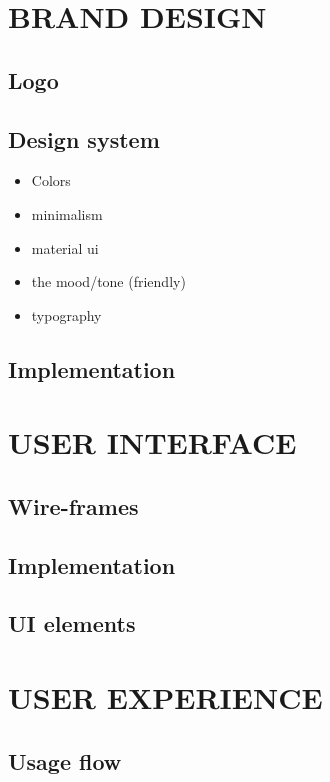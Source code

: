 
\chapter{BRAND DESIGN}
\label{chap:brand}

\section{Logo}
\section{Design system}
\begin{itemize}
    \item Colors
    \item minimalism
    \item material ui
    \item the mood/tone (friendly)
    \item typography
\end{itemize}
\section{Implementation}

\chapter{USER INTERFACE}
\label{chap:ui}

\section{Wire-frames}
\section{Implementation}
\section{UI elements}

\chapter{USER EXPERIENCE}
\label{chap:ux}

\section{Usage flow}
